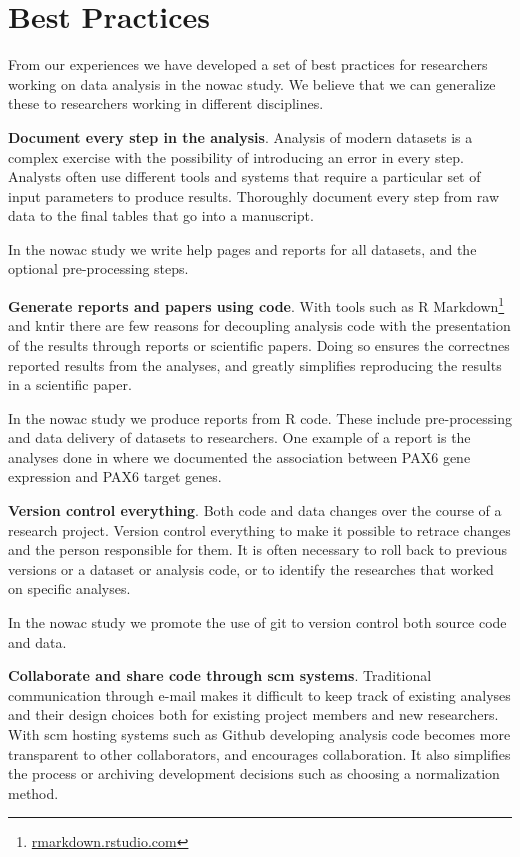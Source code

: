 \section{Best Practices} 
From our experiences we have developed a set of best practices for researchers
working on data analysis in the \gls{nowac} study. We believe that we can
generalize these to researchers working in different disciplines. 

\textbf{Document every step in the analysis}. Analysis of modern datasets is a
complex exercise with the possibility of introducing an error in every step.
Analysts often use different tools and systems that require a particular set of
input parameters to produce results. Thoroughly document every step from raw
data to the final tables that go into a manuscript.

In the \gls{nowac} study we write help pages and reports for all datasets, and
the optional pre-processing steps. 

\textbf{Generate reports and papers using code}. With tools such as R
Markdown\footnote{\url{rmarkdown.rstudio.com}}
and kntir there are few reasons for decoupling analysis code with the
presentation of the results through reports or scientific papers. Doing so
ensures the correctnes reported results from the analyses, and greatly
simplifies reproducing the results in a scientific paper. 

In the \gls{nowac} study we produce reports from R code. These include
pre-processing and data delivery of datasets to researchers. One example of a
report is the analyses done in \cite{kiselev2018transcription} where we
documented the association between PAX6 gene expression and PAX6 target genes.

\textbf{Version control everything}. Both code and data changes over the course
of a research project. Version control everything to make it possible to retrace
changes and the person responsible for them. It is often necessary to roll back
to previous versions or a dataset or analysis code, or to identify the
researches that worked on specific analyses. 

In the \gls{nowac} study we promote the use of git to version control both
source code and data. 

\textbf{Collaborate and share code through \gls{scm} systems}. Traditional
communication through e-mail makes it difficult to keep track of existing
analyses and their design choices both for existing project members and new
researchers. With \gls{scm} hosting systems such as Github developing
analysis code becomes more transparent to other collaborators, and encourages
collaboration. It also simplifies the process or archiving development decisions
such as choosing a normalization method.


